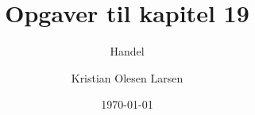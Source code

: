 \documentclass[10pt]{beamer}
\title{Opgaver til kapitel 19}
\subtitle{Handel}
\date{\today}
\author{Kristian Olesen Larsen}
\institute{Department of Economics, University of Copenhagen}
\begin{document}
\maketitle






\newcommand*{\colorboxed}{}
\def\colorboxed#1#{%
  \colorboxedAux{#1}%
}
\newcommand*{\colorboxedAux}[3]{%
  \begingroup
    \colorlet{cb@saved}{.}%
    \color#1{#2}%
    \boxed{%
      \color{cb@saved}%
      #3%
    }%
  \endgroup
}















\end{document}
